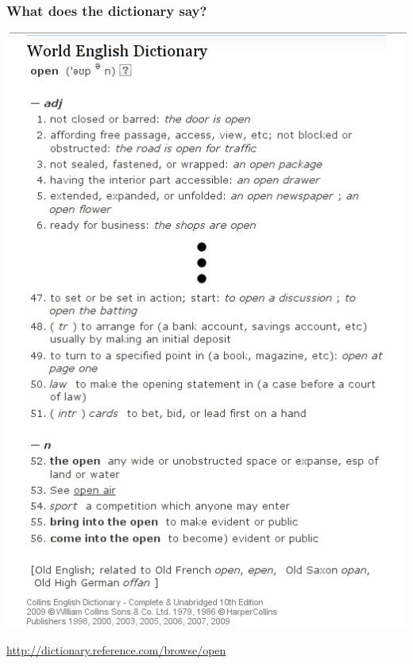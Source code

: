 \documentclass{beamer}
\begin{document}
\begin{frame}
  \frametitle{What does the dictionary say?}
  \begin{center}\includegraphics[height=0.8\textheight]{img/dictionary2}

    \href{http://dictionary.reference.com/browse/open}{http://dictionary.reference.com/browse/open}
  \end{center}
\end{frame}
\end{document}
